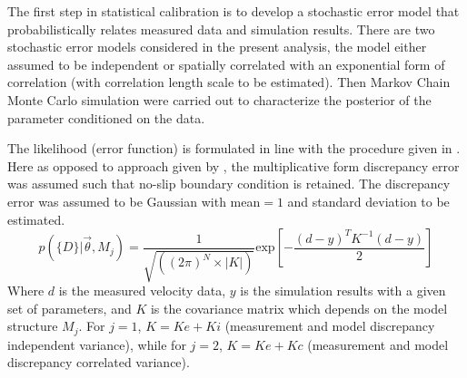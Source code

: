 \documentclass[11pt,titlepage]{article}
\begin{document}
The first step in statistical calibration is to develop a stochastic error model that probabilistically relates measured data and simulation results. 
There are two stochastic error models considered in the present analysis, the model either assumed to be independent or spatially correlated with an exponential form of correlation (with correlation length scale to be estimated). 
Then Markov Chain Monte Carlo simulation were carried out to characterize the posterior of the parameter conditioned on the data.

The likelihood (error function) is formulated in line with the procedure given in \cite{Cheung2011}. 
Here as opposed to approach given by \cite{KennedyOHagan2001}, the multiplicative form discrepancy error was assumed such that no-slip boundary condition is retained. 
The discrepancy error was assumed to be Gaussian with mean$=1$ and standard deviation to be estimated.
\begin{equation}
p(\{D\} | \vec{\theta}, M_j) = \frac{1}{\sqrt{((2\pi)^N \times|K|)}} \text{exp} \left[ - \frac{(d-y)^T K^{-1} (d-y)}{2} \right]
\end{equation}
Where $d$ is the measured velocity data, $y$ is the simulation results with a given set of parameters, and $K$ is the covariance matrix which depends on the model structure $M_j$. 
For $j=1$, $K = Ke + Ki$ (measurement and model discrepancy independent variance), while for $j=2$, $K = Ke + Kc$ (measurement and model discrepancy correlated variance).
\end{document}
